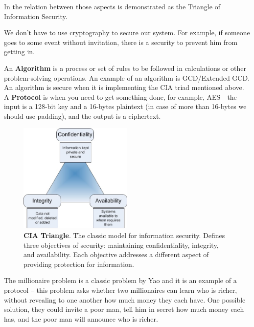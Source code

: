 In  the relation between those aspects is demonstrated as the Triangle of Information Security.

We don’t have to use cryptography to secure our system. For example, if someone goes to some event without invitation, there is a security to prevent him from getting in.

An \textbf{Algorithm} is a process or set of rules to be followed in calculations or other problem-solving operations. An example of an algorithm is GCD/Extended GCD. An algorithm is secure when it is implementing the CIA triad mentioned above.    
A \textbf{Protocol} is when you need to get something done, for example, AES -  the input is a 128-bit key and a 16-bytes plaintext (in case of more than 16-bytes we should use padding), and the output is a ciphertext.

\begin{figure}
    \centering
    \includegraphics[width=0.5\textwidth]{images/ch1_Intro/cia.jpg}
    \caption{\textbf{CIA Triangle}. The classic model for information security. Defines three objectives of security: maintaining confidentiality, integrity, and availability. Each objective addresses a different aspect of providing protection for information.}
    \label{fig:CIA}
\end{figure}

The millionaire problem\cite{lin2005efficient} is a classic problem by Yao and it is an example of a protocol – this problem asks whether two millionaires can learn who is richer, without revealing to one another how much money they each have. One possible solution, they could invite a poor man, tell him in secret how much money each has, and the poor man will announce who is richer.  

